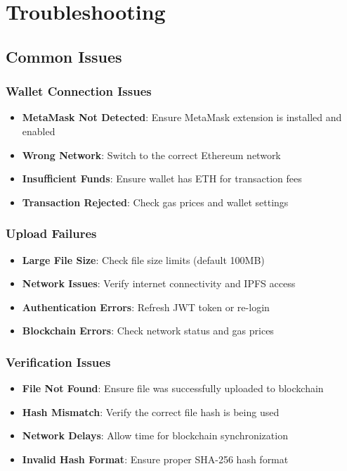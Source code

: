 \documentclass[11pt,a4paper]{article}
\begin{document}
\section{Troubleshooting}

\subsection{Common Issues}

\subsubsection{Wallet Connection Issues}
\begin{itemize}
    \item \textbf{MetaMask Not Detected}: Ensure MetaMask extension is installed and enabled
    \item \textbf{Wrong Network}: Switch to the correct Ethereum network
    \item \textbf{Insufficient Funds}: Ensure wallet has ETH for transaction fees
    \item \textbf{Transaction Rejected}: Check gas prices and wallet settings
\end{itemize}

\subsubsection{Upload Failures}
\begin{itemize}
    \item \textbf{Large File Size}: Check file size limits (default 100MB)
    \item \textbf{Network Issues}: Verify internet connectivity and IPFS access
    \item \textbf{Authentication Errors}: Refresh JWT token or re-login
    \item \textbf{Blockchain Errors}: Check network status and gas prices
\end{itemize}

\subsubsection{Verification Issues}
\begin{itemize}
    \item \textbf{File Not Found}: Ensure file was successfully uploaded to blockchain
    \item \textbf{Hash Mismatch}: Verify the correct file hash is being used
    \item \textbf{Network Delays}: Allow time for blockchain synchronization
    \item \textbf{Invalid Hash Format}: Ensure proper SHA-256 hash format
\end{itemize}
\end{document}
